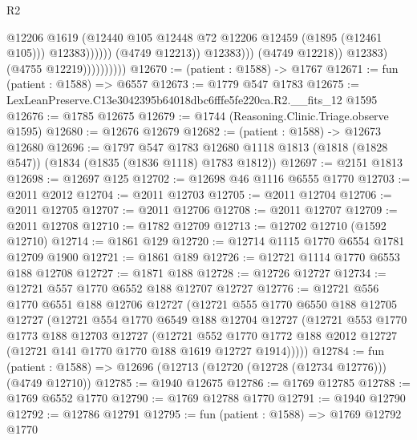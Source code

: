 \begin{lexlean}{R2}
\begin{coremodule}
                                              @12206
                                              @1619
                                              (@12440
                                                @105
                                                @12448
                                                @72
                                                @12206
                                                @12459
                                                (@1895 (@12461 @105)))
                                              @12383))))))
                                  (@4749 @12213))
                                @12383)))
                          (@4749 @12218))
                        @12383)
                      (@4755 @12219))))))))))
@12670 := (patient : @1588) -> @1767
@12671 := fun (patient : @1588) => @6557
@12673 := @1779 @547 @1783
@12675 := LexLeanPreserve.C13e3042395b64018dbc6fffe5fe220ca.R2.__fits_12 @1595
@12676 := @1785 @12675
@12679 := @1744 (Reasoning.Clinic.Triage.observe @1595)
@12680 := @12676 @12679
@12682 := (patient : @1588) -> @12673 @12680
@12696 := @1797
    @547
    @1783
    @12680
    @1118
    @1813
    (@1818 (@1828 @547))
    (@1834 (@1835 (@1836 @1118) @1783 @1812))
@12697 := @2151 @1813
@12698 := @12697 @125
@12702 := @12698 @46 @1116 @6555 @1770
@12703 := @2011 @2012
@12704 := @2011 @12703
@12705 := @2011 @12704
@12706 := @2011 @12705
@12707 := @2011 @12706
@12708 := @2011 @12707
@12709 := @2011 @12708
@12710 := @1782 @12709
@12713 := @12702 @12710 (@1592 @12710)
@12714 := @1861 @129
@12720 := @12714 @1115 @1770 @6554 @1781 @12709 @1900
@12721 := @1861 @189
@12726 := @12721 @1114 @1770 @6553 @188 @12708
@12727 := @1871 @188
@12728 := @12726 @12727
@12734 := @12721 @557 @1770 @6552 @188 @12707 @12727
@12776 := @12721
    @556
    @1770
    @6551
    @188
    @12706
    @12727
    (@12721
      @555
      @1770
      @6550
      @188
      @12705
      @12727
      (@12721
        @554
        @1770
        @6549
        @188
        @12704
        @12727
        (@12721
          @553
          @1770
          @1773
          @188
          @12703
          @12727
          (@12721
            @552
            @1770
            @1772
            @188
            @2012
            @12727
            (@12721 @141 @1770 @1770 @188 @1619 @12727 @1914)))))
@12784 := fun (patient : @1588) => @12696 (@12713 (@12720 (@12728 (@12734 @12776))) (@4749 @12710))
@12785 := @1940 @12675
@12786 := @1769 @12785
@12788 := @1769 @6552 @1770
@12790 := @1769 @12788 @1770
@12791 := @1940 @12790
@12792 := @12786 @12791
@12795 := fun (patient : @1588) => @1769 @12792 @1770

\end{coremodule}
\end{lexlean}
